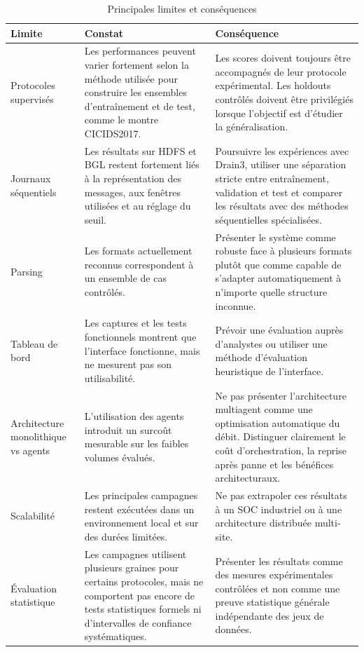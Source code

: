 \begin{table}[H]
\centering
\caption{Principales limites et conséquences}
\label{tab:limites-principales}
\scriptsize

\begin{tabularx}{\textwidth}{p{3.2cm}X X}
\toprule

\textbf{Limite} &
\textbf{Constat} &
\textbf{Conséquence}
\tabularnewline

\midrule

Protocoles supervisés &
Les performances peuvent varier fortement selon la méthode utilisée pour construire les ensembles d'entraînement et de test, comme le montre CICIDS2017. &
Les scores doivent toujours être accompagnés de leur protocole expérimental. Les holdouts contrôlés doivent être privilégiés lorsque l'objectif est d'étudier la généralisation.
\tabularnewline

Journaux séquentiels &
Les résultats sur HDFS et BGL restent fortement liés à la représentation des messages, aux fenêtres utilisées et au réglage du seuil. &
Poursuivre les expériences avec Drain3, utiliser une séparation stricte entre entraînement, validation et test et comparer les résultats avec des méthodes séquentielles spécialisées.
\tabularnewline

Parsing &
Les formats actuellement reconnus correspondent à un ensemble de cas contrôlés. &
Présenter le système comme robuste face à plusieurs formats plutôt que comme capable de s'adapter automatiquement à n'importe quelle structure inconnue.
\tabularnewline

Tableau de bord &
Les captures et les tests fonctionnels montrent que l'interface fonctionne, mais ne mesurent pas son utilisabilité. &
Prévoir une évaluation auprès d'analystes ou utiliser une méthode d'évaluation heuristique de l'interface.
\tabularnewline

Architecture monolithique vs agents &
L'utilisation des agents introduit un surcoût mesurable sur les faibles volumes évalués. &
Ne pas présenter l'architecture multiagent comme une optimisation automatique du débit. Distinguer clairement le coût d'orchestration, la reprise après panne et les bénéfices architecturaux.
\tabularnewline

Scalabilité &
Les principales campagnes restent exécutées dans un environnement local et sur des durées limitées. &
Ne pas extrapoler ces résultats à un SOC industriel ou à une architecture distribuée multi-site.
\tabularnewline

Évaluation statistique &
Les campagnes utilisent plusieurs graines pour certains protocoles, mais ne comportent pas encore de tests statistiques formels ni d'intervalles de confiance systématiques. &
Présenter les résultats comme des mesures expérimentales contrôlées et non comme une preuve statistique générale indépendante des jeux de données.
\tabularnewline


\end{tabularx}
\end{table}
